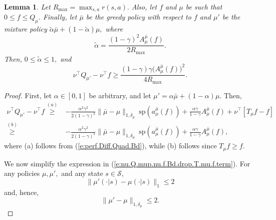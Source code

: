 \documentclass[twoside]{article}
\theoremstyle{plain}
\newtheorem{lemma}[theorem]{Lemma}
\theoremstyle{definition}
\theoremstyle{remark}
\renewcommand{\sp}{\mathrm{sp}}
\newcommand{\tr}{\top}
\newcommand{\mup}{\mu'}
\newcommand{\mub}{\bar{\mu}}
\newcommand{\cS}{\mathcal{S}}
\renewcommand{\eqref}[1]{(\ref{#1})}
\begin{document}
\begin{lemma}
\label{lem:A.mu.mub.Bd.al.less.than.1}
    Let $R_{\max} = \max_{s, a}r(s, a).$ Also, let $f$ and $\mu$ be such that  $0 \leq f \leq Q_{\mu}.$ Finally, let $\mub$ be the greedy policy with respect to $f$ and $\mup$ be the mixture policy $\tilde{\alpha} \mub + (1 - \tilde{\alpha}) \mu,$ where
    \[
        \tilde{\alpha} = \frac{(1 - \gamma)^2 A_{\mu}^{\mub}(f)}{2 R_{\max}}.
    \]
    Then, $0 \leq \tilde{\alpha} \leq 1,$ and 
    \[
        \nu^\tr Q_{\mup} - \nu^\tr f \geq \frac{(1 - \gamma) \gamma \Big(A_\mu^{\mub}(f)\Big)^2}{4 R_{\max}}.
    \]
\end{lemma}
%
\begin{proof}
    First, let $\alpha \in [0, 1]$ be arbitrary, and let $\mup = \alpha \mub + (1 - \alpha) \mu.$ Then, 
    \begin{align}
        \nu^\tr Q_{\mup} - \nu^\tr f \overset{(a)}{\geq} {} & - \frac{ \alpha^2 \gamma^2}{2  (1 - \gamma)^2} \|\mub - \mu\|_{1, \delta_\mu}\ \sp(a_\mu^{\mub} (f)) + \frac{ \alpha\gamma}{1 - \gamma} A_{\mu}^{\mub} (f) + \nu^\tr [T_{\mu}f - f] \\
        \overset{(b)}{\geq} {} & - \frac{ \alpha^2 \gamma^2}{2  (1 - \gamma)^2} \|\mub - \mu\|_{1, \delta_\mu}\ \sp(a_\mu^{\mub} (f)) + \frac{ \alpha\gamma}{1 - \gamma} A_{\mu}^{\mub} (f) \label{e:nu.Q.mup.nu.f.Bd.drop.T.mu.f.term},
    \end{align}
    where (a) follows from \eqref{e:perf.Diff.Quad.Bd}, while (b) follows since $T_{\mu} f \geq f.$

    We now simplify the expression in \eqref{e:nu.Q.mup.nu.f.Bd.drop.T.mu.f.term}. For any policies $\mu, \mup,$ and any state $s \in \cS$,
    \begin{equation}
        \| \mup(\cdot|s)-\mu(\cdot|s) \|_{1} \le 2
    \end{equation}
    and, hence, 
    \begin{equation}
    \label{e:mu.mup.gap.Bd}
        \|\mup - \mu\|_{1, \delta_\mu} \leq 2.
    \end{equation}
    

\end{proof}
\end{document}
